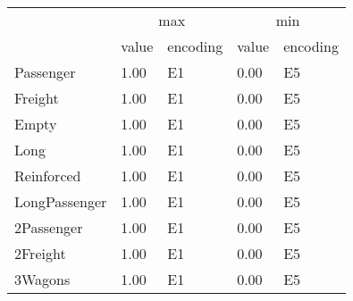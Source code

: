 \begin{tabular}{lllll}
\toprule
 & \multicolumn{2}{c}{max} & \multicolumn{2}{c}{min} \\
 & value & encoding & value & encoding \\
\midrule
Passenger & 1.00 & E1 & 0.00 & E5 \\
Freight & 1.00 & E1 & 0.00 & E5 \\
Empty & 1.00 & E1 & 0.00 & E5 \\
Long & 1.00 & E1 & 0.00 & E5 \\
Reinforced & 1.00 & E1 & 0.00 & E5 \\
LongPassenger & 1.00 & E1 & 0.00 & E5 \\
2Passenger & 1.00 & E1 & 0.00 & E5 \\
2Freight & 1.00 & E1 & 0.00 & E5 \\
3Wagons & 1.00 & E1 & 0.00 & E5 \\
\bottomrule
\end{tabular}
